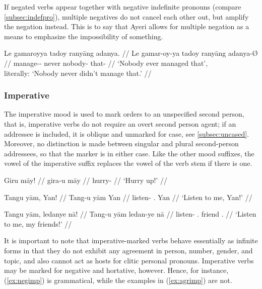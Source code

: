 \xe

If negated verbs appear together with negative indefinite pronouns (compare 
\autoref{subsec:indefpro}), multiple negatives do not cancel each other out, 
but amplify the negation instead. This is to say that Ayeri allows for multiple
negation as a means to emphasize the 
impossibility of something.

\ex
\begingl
	\gla Le gamaroyya tadoy ranyāng adanya. //
	\glb Le gamar-oy-ya tadoy ranyāng adanya-Ø //
	\glc \PatTI{} manage-\Neg{}-\TsgM{} never nobody-\Aarg{} that-\Top{} //
	\glft `Nobody ever managed that',\\
		literally: `Nobody never didn't manage that.' //
\endgl
\xe


\subsubsection{Imperative}

The imperative mood is used to mark orders to an unspecified second person,
that is, imperative verbs do not require an overt second person agent; if an
addressee is included, it is oblique and unmarked for case, see
\autoref{subsec:uncased}. Moreover, no distinction is made between singular and
plural second-person addressees, so that the marker is  in either
case. Like the other mood suffixes, the vowel of the imperative suffix replaces
the vowel of the verb stem if there is one.

\pex
\a\begingl
	\gla Giru māy! //
	\glb gira-u māy //
	\glc hurry-\Imp{} \Int{} //
	\glft `Hurry up!' //
\endgl

\a\begingl
	\gla Tangu yām, Yan! //
	\glb Tang-u yām Yan //
	\glc listen-\Imp{} \Fsg{}.\Dat{} Yan //
	\glft `Listen to me, Yan!' //
\endgl

\a\begingl
	\gla Tangu yām, ledanye nā! //
	\glb Tang-u yām ledan-ye nā //
	\glc listen-\Imp{} \Fsg{}.\Dat{} friend \Fsg{}.\Gen{} //
	\glft `Listen to me, my friends!' //
\endgl

\xe

It is important to note that imperative-marked verbs behave essentially as
infinite forms in that they do not exhibit any  agreement in person, number,
gender, and topic, and also cannot act as hosts  for clitic personal pronouns.
Imperative verbs may be marked for negative and  hortative, however. Hence,
for instance, (\ref{ex:negimp}) is grammatical,  while the examples in
(\ref{ex:agrimp}) are not.

